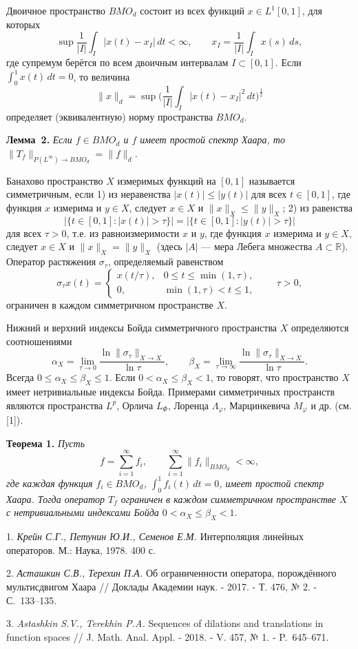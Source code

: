 Двоичное пространство $BMO_d$ состоит из всех функций $x\in L^1[0,1]$, для которых
$$
\sup\frac{1}{|I|}\int_I|x(t)-x_I|\,dt<\infty, \qquad x_I=\frac{1}{|I|}\int_Ix(s)\,ds,
$$
где супремум берётся по всем двоичным интервалам $I\subset[0,1]$. Если $\int_0^1x(t)\,dt=0$, то величина
$$
\|x\|_d=\sup\biggl(\frac{1}{|I|}\int_I|x(t)-x_I|^2\,dt\biggr)^{\frac12}
$$
определяет (эквивалентную) норму пространства $BMO_d$.

\textbf{Лемма~2.} {\it Если $f\in BMO_d$ и $f$ имеет простой спектр Хаара, то $\|T_f\|_{P(L^{\infty})\to BMO_d}=\|f\|_d$.}

Банахово пространство $X$ измеримых функций на $[0,1]$ называется симметричным, если
1) из неравенства $|x(t)|\leqslant|y(t)|$ для всех $t\in[0,1]$,
где функция $x$ измерима и $y\in X$, следует $x\in X$ и $\|x\|_X\leqslant\|y\|_X$;
2) из равенства
$$
|\{t\in[0,1]:|x(t)|>\tau\}|=|\{t\in[0,1]:|y(t)|>\tau\}|
$$
для всех $\tau>0$, т.е. из равноизмеримости $x$ и $y$, где функция $x$ измерима и $y\in X$,
следует $x\in X$ и $\|x\|_X=\|y\|_X$ (здесь $|A|$ --- мера Лебега множества $A\subset\mathbb{R}$).
Оператор растяжения $\sigma_{\tau}$, определяемый равенством
$$
\sigma_{\tau}x(t)=\begin{cases}
x(t/\tau), & 0\leqslant t\leqslant\min(1,\tau),\\
0, & \min(1,\tau)<t\leqslant1,
\end{cases}
\qquad \tau>0,
$$
ограничен в каждом симметричном пространстве $X$.

Нижний и верхний индексы Бойда симметричного пространства $X$ определяются соотношениями
$$
\alpha_X=\lim_{\tau\to0}\frac{\ln\|\sigma_{\tau}\|_{X\to X}}{\ln\tau}, \qquad
\beta_X=\lim_{\tau\to\infty}\frac{\ln\|\sigma_{\tau}\|_{X\to X}}{\ln\tau}.
$$
Всегда $0\leqslant\alpha_X\leqslant\beta_X\leqslant1$. Если $0<\alpha_X\leqslant\beta_X<1$, то говорят, что пространство $X$ имеет нетривиальные индексы Бойда.
Примерами симметричных пространств являются пространства $L^p$, Орлича $L_{\varPhi}$, Лоренца $\varLambda_{\varphi}$, Марцинкевича $M_{\varphi}$ и др. (см. [1]).

\textbf{Теорема 1.} {\it Пусть
$$
f=\sum_{i=1}^{\infty}f_i, \qquad \sum_{i=1}^{\infty}\|f_i\|_{BMO_d}<\infty,
$$
где каждая функция $f_i\in BMO_d$, $\int_0^1f_i(t)\,dt=0$, имеет простой спектр Хаара. Тогда оператор $T_f$ ограничен в каждом симметричном пространстве $X$ с нетривиальными индексами Бойда $0<\alpha_X\leqslant\beta_X<1$.}


\litlist

1. {\it Крейн С.Г., Петунин Ю.И., Семенов Е.М.} Интерполяция линейных операторов. М.: Наука, 1978. 400 с.

2. {\it Асташкин С.В., Терехин П.А.} Об ограниченности оператора, порождённого мультисдвигом Хаара // Доклады Академии наук. - 2017. -
Т. 476, № 2. - С.~133--135.

3. {\it Astashkin S.V., Terekhin P.A.} Sequences of dilations and translations in function spaces // J. Math. Anal. Appl. - 2018. -
V. 457, № 1. - P.~645--671.
